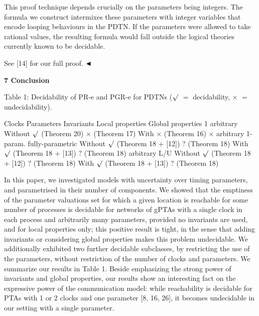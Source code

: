  
 
This proof technique depends crucially on the parameters being integers. The formula we construct intermixes these parameters with integer variables that encode looping behaviours in the PDTN. If the parameters were allowed to take rational values, the resulting formula would fall outside the logical theories currently known to be decidable.\par
 
 
 
See [14] for our full proof. $\hfill\blacktriangleleft$\par
 
 
 
 


 
\par\medskip\noindent\textbf{7 Conclusion}\par
 
 
Table 1: Decidability of PR-e and PGR-e for PDTNs ($\surd$ $=$ decidability, $\times$ $=$ undecidability).\par
    Clocks Parameters Invariants Local properties Global properties   1 arbitrary Without  $\surd$ (Theorem 20)   $\times$ (Theorem 17)    With  $\times$ (Theorem 16)  $\times$   arbitrary 1-param. fully-parametric Without  $\surd$ (Theorem 18 + [12])   $?$ (Theorem 18)    With  $\surd$ (Theorem 18 + [13])   $?$ (Theorem 18)    arbitrary L/U Without  $\surd$ (Theorem 18 + [12])   $?$ (Theorem 18)    With  $\surd$ (Theorem 18 + [13])   $?$ (Theorem 18)     
 
 
In this paper, we investigated models with uncertainty over timing parameters, and parametrised in their number of components. We showed that the emptiness of the parameter valuations set for which a given location is reachable for some number of processes is decidable for networks of gPTAs with a single clock in each process and arbitrarily many parameters, provided no invariants are used, and for local properties only; this positive result is tight, in the sense that adding invariants or considering global properties makes this problem undecidable. We additionally exhibited two further decidable subclasses, by restricting the use of the parameters, without restriction of the number of clocks and parameters. We summarize our results in Table 1. Beside emphasizing the strong power of invariants and global properties, our results show an interesting fact on the expressive power of the communication model: while reachability is decidable for PTAs with 1 or 2 clocks and one parameter [8, 16, 26], it becomes undecidable in our setting with a single parameter.\par
 
